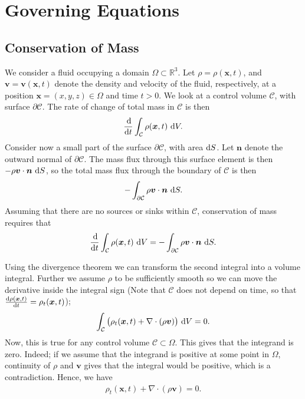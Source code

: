 \documentclass[11pt]{article}
\begin{document}
\section{Governing Equations}

\subsection{Conservation of Mass}

We consider a fluid occupying a domain $\Omega \subset \mathbb{R}^3$. Let $\rho = \rho(\bm{x}, t)$, and
$\bm{v} = \bm{v}(\bm{x},t)$ denote the density and velocity of the fluid, respectively, at a position
$\bm{x} = (x,y,z) \in \Omega$ and time $t > 0$. We look at a control volume $\mathcal{C}$, with surface $\partial \mathcal{C}$.
The rate of change of total mass in $\mathcal{C}$ is then
\begin{align*}
    \frac{\operatorname{d}\!}{\operatorname{d}\! t}\int_\mathcal{C} \rho(\bm{x},t) \, \operatorname{d}\! V.
\end{align*}
Consider now a small part of the surface $\partial \mathcal{C}$, with area $\operatorname{d}\! S$. Let $\bm{n}$ denote the outward normal
of $\partial \mathcal{C}$. The mass flux through this surface element is then $-\rho \bm{v} \cdot \bm{n} \, \operatorname{d}\! S$, so the
total mass flux through the boundary of $\mathcal{C}$ is then
\begin{align*}
    -\int_{\partial \mathcal{C}}\rho \bm{v} \cdot \bm{n} \, \operatorname{d}\! S.
\end{align*}
Assuming that there are no sources or sinks within $\mathcal{C}$, conservation of mass requires that
\begin{align*}
    \frac{\operatorname{d}\!}{\operatorname{d}\! t}\int_\mathcal{C} \rho(\bm{x},t) \, \operatorname{d}\! V
                            = -\int_{\partial \mathcal{C}}\rho \bm{v} \cdot \bm{n} \, \operatorname{d}\! S.
\end{align*}

Using the divergence theorem we can transform the second integral into
a volume integral. Further we assume $\rho$ to be sufficiently smooth
so we can move the derivative inside the integral sign (Note that
$\mathcal{C}$ does not depend on time, so that $\frac{\operatorname{d}\! \rho(\bm x,t)}{\operatorname{d}\!
  t}= \rho_t(\bm x, t)$);
\begin{align*}
    \int_\mathcal{C} \big(\rho_t(\bm{x},t) + \nabla \cdot (\rho \bm{v}) \big) \, \operatorname{d}\! V = 0.
\end{align*}
Now, this is true for any control volume $\mathcal{C} \subset \Omega$. This gives that the integrand is zero. Indeed;
if we assume that the integrand is positive at some point in $\Omega$, continuity of $\rho$ and $\bm{v}$
gives that the integral would be positive, which is a contradiction. Hence, we have
\begin{align}
    \label{eq:massConservation}
    \rho_t(\bm{x},t) + \nabla \cdot (\rho \bm{v}) = 0.
\end{align}
%
%
\end{document}
